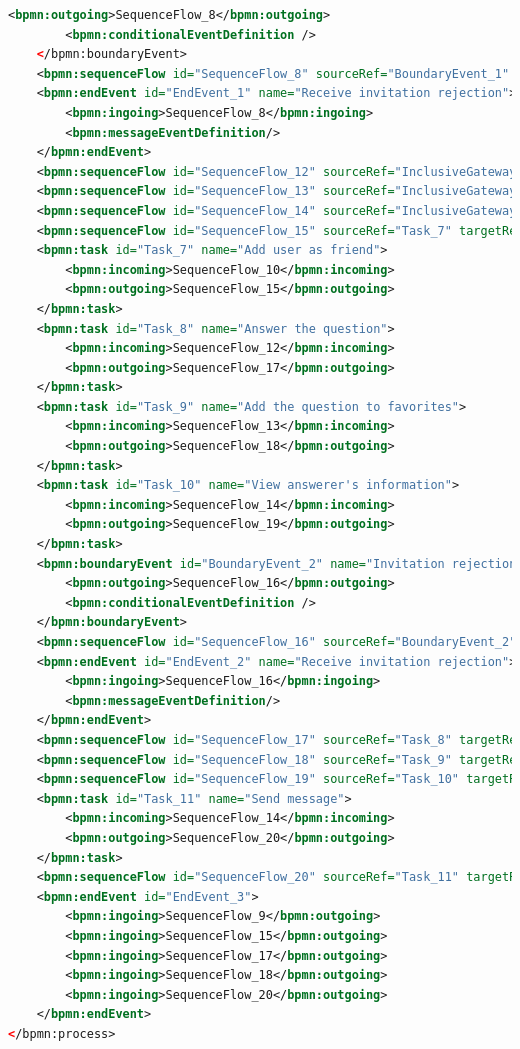 \documentclass[runningheads]{llncs}
\begin{document}
\begin{lstlisting}[language={XML}]
        <bpmn:outgoing>SequenceFlow_8</bpmn:outgoing>
        <bpmn:conditionalEventDefinition />
    </bpmn:boundaryEvent>
    <bpmn:sequenceFlow id="SequenceFlow_8" sourceRef="BoundaryEvent_1" targetRef="EndEvent_1" />
    <bpmn:endEvent id="EndEvent_1" name="Receive invitation rejection">
        <bpmn:ingoing>SequenceFlow_8</bpmn:ingoing>
        <bpmn:messageEventDefinition/>
    </bpmn:endEvent>
    <bpmn:sequenceFlow id="SequenceFlow_12" sourceRef="InclusiveGateway_2" targetRef="Task_8" />
    <bpmn:sequenceFlow id="SequenceFlow_13" sourceRef="InclusiveGateway_2" targetRef="Task_9" />
    <bpmn:sequenceFlow id="SequenceFlow_14" sourceRef="InclusiveGateway_2" targetRef="Task_10" />
    <bpmn:sequenceFlow id="SequenceFlow_15" sourceRef="Task_7" targetRef="EndEvent_3" />
    <bpmn:task id="Task_7" name="Add user as friend">
        <bpmn:incoming>SequenceFlow_10</bpmn:incoming>
        <bpmn:outgoing>SequenceFlow_15</bpmn:outgoing>
    </bpmn:task>
    <bpmn:task id="Task_8" name="Answer the question">
        <bpmn:incoming>SequenceFlow_12</bpmn:incoming>
        <bpmn:outgoing>SequenceFlow_17</bpmn:outgoing>
    </bpmn:task>
    <bpmn:task id="Task_9" name="Add the question to favorites">
        <bpmn:incoming>SequenceFlow_13</bpmn:incoming>
        <bpmn:outgoing>SequenceFlow_18</bpmn:outgoing>
    </bpmn:task>
    <bpmn:task id="Task_10" name="View answerer's information">
        <bpmn:incoming>SequenceFlow_14</bpmn:incoming>
        <bpmn:outgoing>SequenceFlow_19</bpmn:outgoing>
    </bpmn:task>
    <bpmn:boundaryEvent id="BoundaryEvent_2" name="Invitation rejection" attachedToRef="Task_7">
        <bpmn:outgoing>SequenceFlow_16</bpmn:outgoing>
        <bpmn:conditionalEventDefinition />
    </bpmn:boundaryEvent>
    <bpmn:sequenceFlow id="SequenceFlow_16" sourceRef="BoundaryEvent_2" targetRef="EndEvent_2" />
    <bpmn:endEvent id="EndEvent_2" name="Receive invitation rejection">
        <bpmn:ingoing>SequenceFlow_16</bpmn:ingoing>
        <bpmn:messageEventDefinition/>
    </bpmn:endEvent>
    <bpmn:sequenceFlow id="SequenceFlow_17" sourceRef="Task_8" targetRef="EndEvent_3" />
    <bpmn:sequenceFlow id="SequenceFlow_18" sourceRef="Task_9" targetRef="EndEvent_3" />
    <bpmn:sequenceFlow id="SequenceFlow_19" sourceRef="Task_10" targetRef="Task_11" />
    <bpmn:task id="Task_11" name="Send message">
        <bpmn:incoming>SequenceFlow_14</bpmn:incoming>
        <bpmn:outgoing>SequenceFlow_20</bpmn:outgoing>
    </bpmn:task>
    <bpmn:sequenceFlow id="SequenceFlow_20" sourceRef="Task_11" targetRef="EndEvent_3" />
    <bpmn:endEvent id="EndEvent_3">
        <bpmn:ingoing>SequenceFlow_9</bpmn:outgoing>
        <bpmn:ingoing>SequenceFlow_15</bpmn:outgoing>
        <bpmn:ingoing>SequenceFlow_17</bpmn:outgoing>
        <bpmn:ingoing>SequenceFlow_18</bpmn:outgoing>
        <bpmn:ingoing>SequenceFlow_20</bpmn:outgoing>
    </bpmn:endEvent>
</bpmn:process>
\end{lstlisting}
\end{document}
